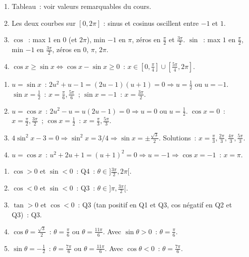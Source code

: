 \begin{enumerate}
  \item Tableau~: voir valeurs remarquables du cours.
  \item Les deux courbes sur $[0,2\pi]$ : sinus et cosinus oscillent entre $-1$ et $1$.
  \item $\cos$~: max $1$ en $0$ (et $2\pi$), min $-1$ en $\pi$, z\'eros en $\frac{\pi}{2}$ et $\frac{3\pi}{2}$.
        $\sin$~: max $1$ en $\frac{\pi}{2}$, min $-1$ en $\frac{3\pi}{2}$, z\'eros en $0$, $\pi$, $2\pi$.
  \item $\cos x\geq\sin x\Leftrightarrow\cos x-\sin x\geq0$~: $x\in[0,\frac{\pi}{4}]\cup[\frac{5\pi}{4},2\pi]$.
\end{enumerate}


\begin{enumerate}
  \item $u=\sin x$~: $2u^2+u-1=(2u-1)(u+1)=0\Rightarrow u=\frac{1}{2}$ ou $u=-1$.
        $\sin x=\frac{1}{2}$~: $x=\frac{\pi}{6},\frac{5\pi}{6}$~; $\sin x=-1$~: $x=\frac{3\pi}{2}$.
  \item $u=\cos x$~: $2u^2-u=u(2u-1)=0\Rightarrow u=0$ ou $u=\frac{1}{2}$.
        $\cos x=0$~: $x=\frac{\pi}{2},\frac{3\pi}{2}$~; $\cos x=\frac{1}{2}$~: $x=\frac{\pi}{3},\frac{5\pi}{3}$.
  \item $4\sin^2x-3=0\Rightarrow\sin^2x=3/4\Rightarrow\sin x=\pm\frac{\sqrt{3}}{2}$.
        Solutions~: $x=\frac{\pi}{3},\frac{2\pi}{3},\frac{4\pi}{3},\frac{5\pi}{3}$.
  \item $u=\cos x$~: $u^2+2u+1=(u+1)^2=0\Rightarrow u=-1\Rightarrow\cos x=-1$~: $x=\pi$.
\end{enumerate}


\begin{enumerate}
  \item $\cos>0$ et $\sin<0$~: Q4~: $\theta\in]\frac{3\pi}{2},2\pi[$.
  \item $\cos<0$ et $\sin<0$~: Q3~: $\theta\in]\pi,\frac{3\pi}{2}[$.
  \item $\tan>0$ et $\cos<0$~: Q3 (tan positif en Q1 et Q3, cos n\'egatif en Q2 et Q3)~: Q3.
  \item $\cos\theta=\frac{\sqrt{3}}{2}$~: $\theta=\frac{\pi}{6}$ ou $\theta=\frac{11\pi}{6}$. Avec $\sin\theta>0$~: $\theta=\frac{\pi}{6}$.
  \item $\sin\theta=-\frac{1}{2}$~: $\theta=\frac{7\pi}{6}$ ou $\theta=\frac{11\pi}{6}$. Avec $\cos\theta<0$~: $\theta=\frac{7\pi}{6}$.
\end{enumerate}

